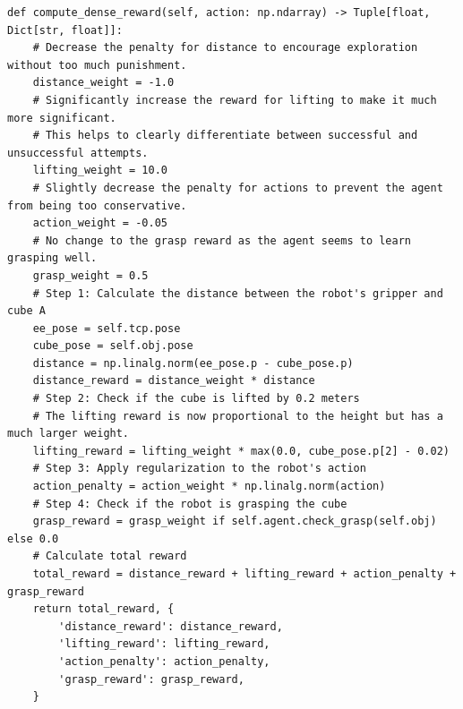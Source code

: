\documentclass{article}
\theoremstyle{plain}
\theoremstyle{definition}
\theoremstyle{remark}
\begin{document}
\begin{table}[!ht]
\begin{tcolorbox}
\begin{lstlisting}[breaklines]
def compute_dense_reward(self, action: np.ndarray) -> Tuple[float, Dict[str, float]]:
    # Decrease the penalty for distance to encourage exploration without too much punishment.
    distance_weight = -1.0
    # Significantly increase the reward for lifting to make it much more significant.
    # This helps to clearly differentiate between successful and unsuccessful attempts.
    lifting_weight = 10.0
    # Slightly decrease the penalty for actions to prevent the agent from being too conservative.
    action_weight = -0.05
    # No change to the grasp reward as the agent seems to learn grasping well.
    grasp_weight = 0.5
    # Step 1: Calculate the distance between the robot's gripper and cube A
    ee_pose = self.tcp.pose
    cube_pose = self.obj.pose
    distance = np.linalg.norm(ee_pose.p - cube_pose.p)
    distance_reward = distance_weight * distance
    # Step 2: Check if the cube is lifted by 0.2 meters
    # The lifting reward is now proportional to the height but has a much larger weight.
    lifting_reward = lifting_weight * max(0.0, cube_pose.p[2] - 0.02)
    # Step 3: Apply regularization to the robot's action
    action_penalty = action_weight * np.linalg.norm(action)
    # Step 4: Check if the robot is grasping the cube
    grasp_reward = grasp_weight if self.agent.check_grasp(self.obj) else 0.0
    # Calculate total reward
    total_reward = distance_reward + lifting_reward + action_penalty + grasp_reward
    return total_reward, {
        'distance_reward': distance_reward,
        'lifting_reward': lifting_reward,
        'action_penalty': action_penalty,
        'grasp_reward': grasp_reward,
    }
\end{lstlisting}
\end{tcolorbox}
\label{tab:iterative_process_on_liftcube_2}
\end{table}
\end{document}
